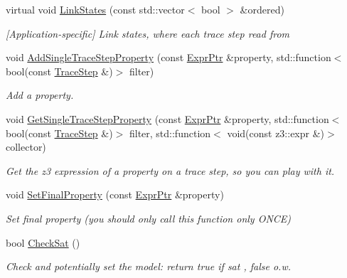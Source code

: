 \begin{DoxyCompactItemize}
virtual void \mbox{\hyperlink{classilang_1_1_inter_ila_unroller_a7a3dc348887464db257ac8bd84c36324}{Link\+States}} (const std\+::vector$<$ bool $>$ \&ordered)
\begin{DoxyCompactList}\small\item\em \mbox{[}Application-\/specific\mbox{]} Link states, where each trace step read from \end{DoxyCompactList}\item 
void \mbox{\hyperlink{classilang_1_1_inter_ila_unroller_a2c4a41a5a7bcd6ec89e757bc12823da7}{Add\+Single\+Trace\+Step\+Property}} (const \mbox{\hyperlink{namespaceilang_a7c4196c72e53ea4df4b7861af7bc3bce}{Expr\+Ptr}} \&property, std\+::function$<$ bool(const \mbox{\hyperlink{classilang_1_1_trace_step}{Trace\+Step}} \&)$>$ filter)
\begin{DoxyCompactList}\small\item\em Add a property. \end{DoxyCompactList}\item 
void \mbox{\hyperlink{classilang_1_1_inter_ila_unroller_ae341d1d6ee4ce09419821a970cc79c39}{Get\+Single\+Trace\+Step\+Property}} (const \mbox{\hyperlink{namespaceilang_a7c4196c72e53ea4df4b7861af7bc3bce}{Expr\+Ptr}} \&property, std\+::function$<$ bool(const \mbox{\hyperlink{classilang_1_1_trace_step}{Trace\+Step}} \&)$>$ filter, std\+::function$<$ void(const z3\+::expr \&)$>$ collector)
\begin{DoxyCompactList}\small\item\em Get the z3 expression of a property on a trace step, so you can play with it. \end{DoxyCompactList}\item 
void \mbox{\hyperlink{classilang_1_1_inter_ila_unroller_a7d187936775e69e41c24fbef3aa5ca22}{Set\+Final\+Property}} (const \mbox{\hyperlink{namespaceilang_a7c4196c72e53ea4df4b7861af7bc3bce}{Expr\+Ptr}} \&property)
\begin{DoxyCompactList}\small\item\em Set final property (you should only call this function only O\+N\+CE) \end{DoxyCompactList}\item 
\mbox{\label{classilang_1_1_inter_ila_unroller_a4916b8b8859c4c9d7f8880c59520ea5b}} 
bool \mbox{\hyperlink{classilang_1_1_inter_ila_unroller_a4916b8b8859c4c9d7f8880c59520ea5b}{Check\+Sat}} ()
\begin{DoxyCompactList}\small\item\em Check and potentially set the model\+: return true if sat , false o.\+w. \end{DoxyCompactList}\item 

\end{DoxyCompactItemize}
